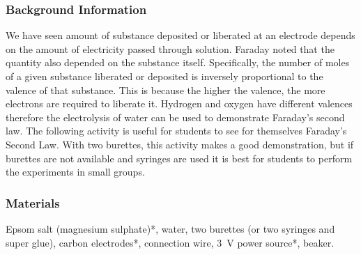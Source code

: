 \subsubsection*{Background Information}
We have seen amount of substance deposited or liberated at an electrode depends on the amount of electricity passed through solution. Faraday noted that the quantity also depended on the substance itself. Specifically, the number of moles of a given substance liberated or deposited is inversely proportional to the valence of that substance. This is because the higher the valence, the more electrons are required to liberate it. Hydrogen and oxygen have different valences therefore the electrolysis of water can be used to demonstrate Faraday's second law. 
The following activity is useful for students to see for themselves Faraday's Second Law. With two burettes, this activity makes a good demonstration, but if burettes are not available and syringes are used it is best for students to perform the experiments in small groups.

\subsubsection*{Materials}
Epsom salt (magnesium sulphate)*, water, two burettes (or two syringes and super glue), carbon electrodes*, connection wire, 3~V power source*, beaker.

